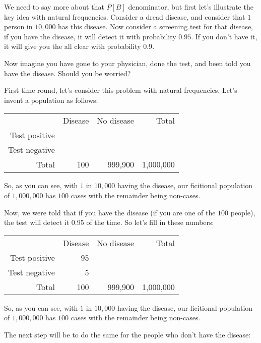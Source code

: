 \documentclass[12pt]{extbook}
\begin{document}
 

We need to say more about that $P[B]$ denominator, but first let's illustrate the key idea with natural frequencies.   Consider a dread disease, and consider that $1$ person in $10,000$ has this disease.   Now consider a screening test for that disease, if you have the disease, it will detect it with probability $0.95$.   If you don't have it, it will give you the all clear with probability $0.9$.   

Now imagine you have gone to your physician, done the test, and been told you have the disease.   Should you be worried?

 

First time round, let's consider this problem with natural frequencies.   Let's invent a population as follows:

\begin{tabular}{rrrr}
 & Disease & No disease & Total \\
Test positive \phantom{95} & \phantom{99,990} & \phantom{100,085} \\
Test negative \phantom{5} & \phantom{899,910} & \phantom{899,915} \\
Total & 100 & 999,900 & 1,000,000
\end{tabular}

So, as you can see, with $1$ in $10,000$ having the disease, our ficitional population of $1,000,000$ has $100$ cases with the remainder being non-cases.

 

Now, we were told that if you have the disease (if you are one of the $100$ people), the test will detect it $0.95$ of the time.   So let's fill in these numbers:

\begin{tabular}{rrrr}
 & Disease & No disease & Total \\
Test positive & 95 & \phantom{99,990} & \phantom{100,085} \\
Test negative & 5 & \phantom{899,910} & \phantom{899,915} \\
Total & 100 & 999,900 & 1,000,000
\end{tabular}

So, as you can see, with $1$ in $10,000$ having the disease, our ficitional population of $1,000,000$ has $100$ cases with the remainder being non-cases.

The next step will be to do the same for the people who don't have the disease:


 
\end{document}
